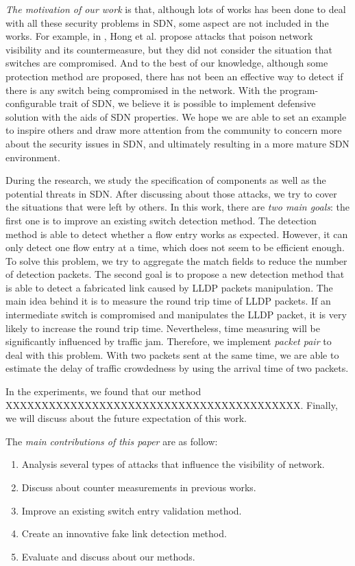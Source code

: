 \emph{The motivation of our work} is that, although lots of works has been done to deal with all these security problems in SDN, some aspect are not included in the works. For example, in \cite{HXWG15}, Hong et al. propose attacks that poison network visibility and its countermeasure, but they did not consider the situation that switches are compromised. And to the best of our knowledge, although some protection method are proposed, there has not been an effective way to detect if there is any switch being compromised in the network. With the program-configurable trait of SDN, we believe it is possible to implement defensive solution with the aids of SDN properties. We hope we are able to set an example to inspire others and draw more attention from the community to concern more about the security issues in SDN, and ultimately resulting in a more mature SDN environment.

During the research, we study the specification of components as well as the potential threats in SDN. After discussing about those attacks, we try to cover the situations that were left by others. In this work, there are \emph{two main goals}: the first one is to improve an existing switch detection method. The detection method is able to detect whether a flow entry works as expected. However, it can only detect one flow entry at a time, which does not seem to be efficient enough. To solve this problem, we try to aggregate the match fields to reduce the number of detection packets. The second goal is to propose a new detection method that is able to detect a fabricated link caused by LLDP packets manipulation. The main idea behind it is to measure the round trip time of LLDP packets. If an intermediate switch is compromised and manipulates the LLDP packet, it is very likely to increase the round trip time. Nevertheless, time measuring will be significantly influenced by traffic jam. Therefore, we implement \textit{packet pair} to deal with this problem. With two packets sent at the same time, we are able to estimate the delay of traffic crowdedness by using the arrival time of two packets.

In the experiments, we found that our method XXXXXXXXXXXXXXXXXXXXXXXXXXXXXXXXXXXXXXXXX. Finally, we will discuss about the future expectation of this work.

The \emph{main contributions of this paper} are as follow:

\begin{enumerate}
\item
Analysis several types of attacks that influence the visibility of network.
\item
Discuss about counter measurements in previous works.
\item
Improve an existing switch entry validation method.
\item
Create an innovative fake link detection method.
\item
Evaluate and discuss about our methods.
\end{enumerate}

